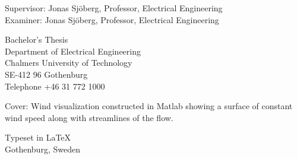 Supervisor: Jonas Sjöberg, Professor, Electrical Engineering\\
Examiner: Jonas Sjöberg, Professor, Electrical Engineering \setlength{\parskip}{1cm}

Bachelor's Thesis \the\year\\	
Department of Electrical Engineering\\
Chalmers University of Technology\\
SE-412 96 Gothenburg\\
Telephone +46 31 772 1000 \setlength{\parskip}{0.5cm}

\vfill
Cover: Wind visualization constructed in Matlab showing a surface of constant wind speed along with streamlines of the flow. \setlength{\parskip}{0.5cm}

Typeset in \LaTeX \tagtemp\\
Gothenburg, Sweden \the\year
